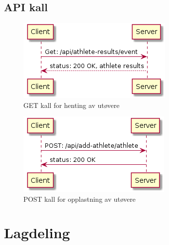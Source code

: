 \documentclass[norsk]{article}
\begin{document}
\subsection{API kall}
\begin{figure}[ht]
\centering 
    \includegraphics[scale=0.7]{images/get-athletes-api-call.png}
    \caption{GET kall for henting av utøvere}\label{fig:get-at-api}
\end{figure}

\begin{figure}[ht]
\centering 
    \includegraphics[scale=0.7]{images/post-athletes-api-call.png}
    \caption{POST kall for opplastning av utøvere}\label{fig:post-at-api}
\end{figure}

\section{Lagdeling}
\end{document}

